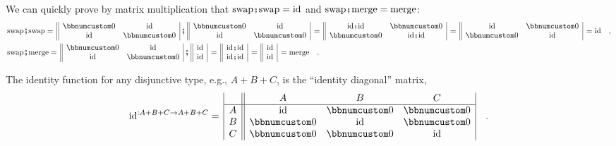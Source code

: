 We can quickly prove by matrix multiplication that $\text{swap}\bef\text{swap}=\text{id}$
and $\text{swap}\bef\text{merge}=\text{merge}$:\vspace{0\baselineskip}
\begin{align*}
 & \text{swap}\bef\text{swap}=\,\begin{array}{||cc|}
\bbnum 0 & \text{id}\\
\text{id} & \bbnum 0
\end{array}\,\bef\,\begin{array}{||cc|}
\bbnum 0 & \text{id}\\
\text{id} & \bbnum 0
\end{array}\,=\,\begin{array}{||cc|}
\text{id}\bef\text{id} & \bbnum 0\\
\bbnum 0 & \text{id}\bef\text{id}
\end{array}\,=\,\begin{array}{||cc|}
\text{id} & \bbnum 0\\
\bbnum 0 & \text{id}
\end{array}\,=\text{id}\quad,\\
 & \text{swap}\bef\text{merge}=\,\begin{array}{||cc|}
\bbnum 0 & \text{id}\\
\text{id} & \bbnum 0
\end{array}\,\bef\,\begin{array}{||c|}
\text{id}\\
\text{id}
\end{array}\,=\,\begin{array}{||c|}
\text{id}\bef\text{id}\\
\text{id}\bef\text{id}
\end{array}\,=\,\begin{array}{||c|}
\text{id}\\
\text{id}
\end{array}\,=\text{merge}\quad.
\end{align*}

The identity function for any disjunctive type, e.g., $A+B+C$, is
the \textsf{``}identity diagonal\textsf{''} matrix,
\[
\text{id}^{:A+B+C\rightarrow A+B+C}=\,\begin{array}{|c||ccc|}
 & A & B & C\\
\hline A & \text{id} & \bbnum 0 & \bbnum 0\\
B & \bbnum 0 & \text{id} & \bbnum 0\\
C & \bbnum 0 & \bbnum 0 & \text{id}
\end{array}\quad.
\]

